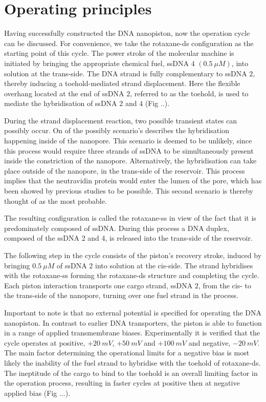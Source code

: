 \section{Operating principles}

Having successfully constructed the DNA nanopiston, now the operation cycle can be
discussed. For convenience, we take the rotaxane-ds configuration as the starting point
of this cycle. The power stroke of the molecular machine is initiated by bringing the
appropriate chemical fuel, ssDNA $4$ $(0.5\ \mu M)$, into solution at the trans-side. The
DNA strand is fully complementary to ssDNA $2$, thereby inducing a toehold-mediated
strand displacement. Here the flexible overhang located at the end of ssDNA $2$, referred
to as the toehold, is used to mediate the hybridisation of ssDNA $2$ and $4$ (Fig ..).

During the strand displacement reaction, two possible transient states can possibly
occur. On of the possibly scenario's describes the hybridisation happening inside of the
nanopore. This scenario is deemed to be unlikely, since this process would require three
strands of ssDNA to be simultaneously present inside the constriction of the nanopore.
Alternatively, the hybridisation can take place outside of the nanopore, in the
trans-side of the reservoir. This process implies that the neutravidin protein would
enter the lumen of the pore, which has been showed by previous studies to be possible.
This second scenario is thereby thought of as the most probable.

The resulting configuration is called the rotaxane-ss in view of the fact that it is
predominately composed of ssDNA. During this process a DNA duplex, composed of the ssDNA
2 and 4, is released into the trans-side of the reservoir.

The following step in the cycle consists of the piston's recovery stroke, induced by
bringing $0.5\ \mu M$ of ssDNA $2$ into solution at the cis-side. The strand hybridises
with the rotaxane-ss forming the rotaxane-ds structure and completing the cycle.
Each piston interaction transports one cargo strand, ssDNA $2$, from the cis- to the
trans-side of the nanopore, turning over one fuel strand in the process.


Important to note is that no external potential is specified for operating the DNA
nanopiston. In contrast to earlier DNA transporters, the piston is able to function in a
range of applied transmembrane biases. Experimentally it is verified that the
cycle operates at positive, $+20\ mV$, $+50\ mV$ and $+100\ mV$ and negative, $−20\ mV$.
The main factor determining the operational limits for a negative bias is most likely
the inability of the fuel strand to hybridise with the toehold of rotaxane-ds. The
ineptitude of the cargo to bind to the toehold is an overall limiting factor in the
operation process, resulting in faster cycles at positive then at negative applied bias
(Fig ...).

